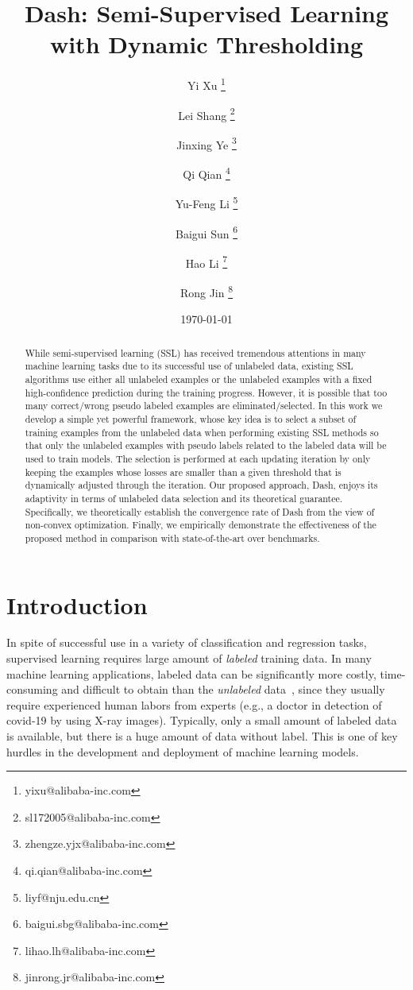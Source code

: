 \documentclass{article}
\begin{document}
\title{\bf Dash: Semi-Supervised Learning with Dynamic Thresholding}
\author[1]{Yi Xu \thanks{yixu@alibaba-inc.com}}
\author[1]{Lei Shang \thanks{sl172005@alibaba-inc.com}}
\author[1]{Jinxing Ye \thanks{zhengze.yjx@alibaba-inc.com}}
\author[1]{Qi Qian \thanks{qi.qian@alibaba-inc.com}}
\author[2]{Yu-Feng Li \thanks{liyf@nju.edu.cn}}
\author[1]{Baigui Sun \thanks{baigui.sbg@alibaba-inc.com}}
\author[1]{Hao Li \thanks{lihao.lh@alibaba-inc.com}}
\author[1]{Rong Jin \thanks{jinrong.jr@alibaba-inc.com}}
\date{\today}
\maketitle




\begin{abstract}
   While semi-supervised learning (SSL) has received tremendous attentions in many machine learning tasks due to its successful use of unlabeled data, existing SSL algorithms use either all unlabeled examples or the unlabeled examples with a fixed high-confidence prediction during the training progress. However, it is possible that too many correct/wrong pseudo labeled examples are eliminated/selected. In this work we develop a simple yet powerful framework, whose key idea is to select a subset of training examples from the unlabeled data when performing existing SSL methods so that only the unlabeled examples with pseudo labels related to the labeled data will be used to train models. The selection is performed at each updating iteration by only keeping the examples whose losses are smaller than a given threshold that is dynamically adjusted through the iteration. Our proposed approach, Dash, enjoys its adaptivity in terms of unlabeled data selection and its theoretical guarantee. Specifically, we theoretically establish the convergence rate of Dash from the view of non-convex optimization. Finally, we empirically demonstrate the effectiveness of the proposed method in comparison with state-of-the-art over benchmarks. 
\end{abstract}


\section{Introduction}
In spite of successful use in a variety of classification and regression tasks, supervised learning requires large amount of \emph{labeled} training data. In many machine learning applications, labeled data can be significantly more costly, time-consuming and difficult to obtain than the \emph{unlabeled} data~\citep{zhu2005semi}, since they usually require experienced human labors from experts (e.g., a doctor in detection of covid-19 by using X-ray images). Typically, only a small amount of labeled data is available, but there is a huge amount of data without label. This is one of key hurdles in the development and deployment of machine learning models. 
\end{document}
